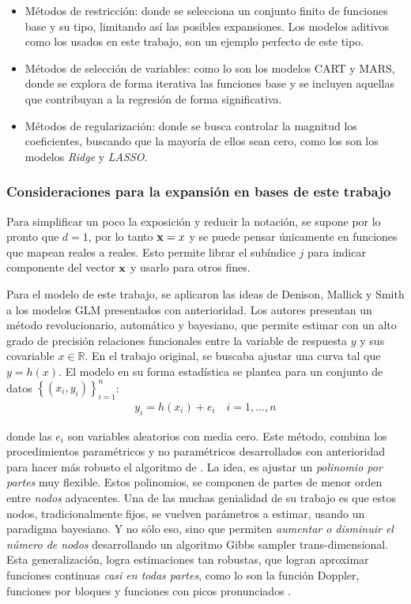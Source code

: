 \documentclass[../Main/Main.tex]{subfiles}
\begin{document}
\begin{itemize}[label={}]
	\item Métodos de restricción: donde se selecciona un conjunto finito de funciones base y su tipo, limitando así las posibles expansiones. Los modelos aditivos como los usados en este trabajo, son un ejemplo perfecto de este tipo.  
	\item Métodos de selección de variables: como lo son los modelos CART y MARS, donde se explora de forma iterativa las funciones base y se incluyen aquellas que contribuyan a la regresión de forma significativa.
	\item Métodos de regularización: donde se busca controlar la magnitud los coeficientes, buscando que la mayoría de ellos sean cero, como los son los modelos \textit{Ridge} y  \textit{LASSO}.
\end{itemize}

\subsubsection{Consideraciones para la expansión en bases de este trabajo}
Para simplificar un poco la exposición y reducir la notación, se supone por lo pronto que $d = 1$, por lo tanto $\mathbf{x} = x$ y se puede pensar únicamente en funciones que mapean reales a reales. Esto permite librar el subíndice $j$ para indicar componente del vector $\mathbf{x}$ y usarlo para otros fines.

Para el modelo de este trabajo, se aplicaron las ideas de Denison, Mallick y Smith a los modelos GLM presentados con anterioridad. Los autores presentan un método revolucionario, automático y bayesiano, que permite estimar con un alto grado de precisión relaciones funcionales entre la variable de respuesta $y$ y sus covariable $x\in\mathbb{R}$. En el trabajo original, se buscaba ajustar una curva tal que $y = h(x)$. El modelo en su forma estadística se plantea para un conjunto de datos $\left\{(x_i,y_i) \right\}_{i = 1}^n$:
\begin{align}
	y_i = h(x_i) + e_i \quad i = 1,\ldots,n \label{ec:EstCurvas}
\end{align}

donde las $e_i$ son variables aleatorios con media cero. Este método, combina  los procedimientos paramétricos y no paramétricos desarrollados con anterioridad para hacer más robusto el algoritmo de \citet{hastie1986generalized}. La idea, es ajustar un \textit{polinomio por partes} muy flexible. Estos polinomios, se componen de partes de menor orden entre \textit{nodos} adyacentes. Una de las muchas genialidad de su trabajo es que estos nodos, tradicionalmente fijos, se vuelven parámetros a estimar, usando un paradigma bayesiano. Y no sólo eso, sino que permiten \textit{aumentar o disminuir el número de nodos} desarrollando un algoritmo Gibbs sampler trans-dimensional. Esta generalización, logra estimaciones tan robustas, que logran aproximar funciones continuas \textit{casi en todas partes}, como lo son la función Doppler, funciones por bloques y funciones con picos pronunciados \autocite{mallik1998automatic}. 
\end{document}
